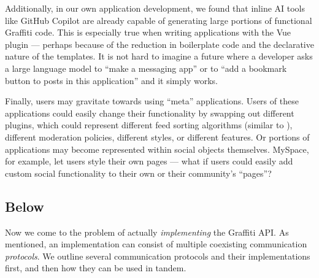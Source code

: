 Additionally, in our own application development,
we found that inline AI tools like GitHub Copilot are already
capable of generating large portions of functional Graffiti code.
This is especially true when writing applications with the
Vue plugin --- perhaps because of the reduction in boilerplate
code and the declarative nature of the templates.
It is not hard to imagine a future where a developer asks
a large language model to ``make a messaging app''
or to ``add a bookmark button to posts in this application'' and
it simply works.

Finally, users may gravitate towards using ``meta'' applications.
Users of these applications could easily change their functionality
by swapping out different plugins,
which could represent different feed sorting algorithms
(similar to \cite{threeleggedstool, bluesky}),
different moderation policies, different styles,
or different features.
Or portions of applications may become represented within social objects themselves.
MySpace, for example, let users style their own pages --- what if users could easily add
custom social functionality to their own
or their community's ``pages''?

\subsection{Below}

Now we come to the problem of actually \emph{implementing} the Graffiti API.
As mentioned, an implementation can consist of multiple coexisting communication
\emph{protocols}.
We outline several communication protocols and their implementations first,
and then how they can be used in tandem.



